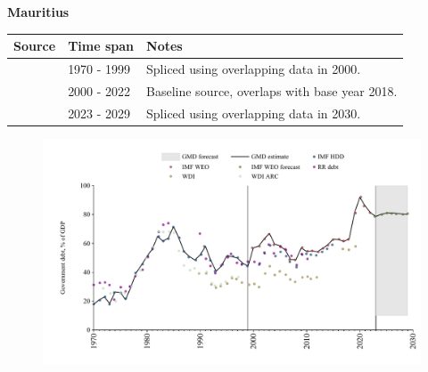 \documentclass[12pt,a4paper,landscape]{article}
\begin{document}
\begin{adjustbox}{max totalsize={\paperwidth}{\paperheight},center}
\begin{minipage}[t][\textheight][t]{\textwidth}
\vspace*{0.5cm}
{}
\begin{center}
{\Large\bfseries Mauritius}
\end{center}
\vspace{0.5cm}
\begin{table}[H]
\centering
\small
\begin{tabular}{|l|l|l|}
\hline
\textbf{Source} & \textbf{Time span} & \textbf{Notes} \\
\hline
\rowcolor{white}\cite{IMF_HDD}& 1970 - 1999 &Spliced using overlapping data in 2000.\\
\rowcolor{lightgray}\cite{IMF_WEO}& 2000 - 2022 &Baseline source, overlaps with base year 2018.\\
\rowcolor{white}\cite{IMF_WEO_forecast}& 2023 - 2029 &Spliced using overlapping data in 2030.\\
\hline
\end{tabular}
\end{table}
\begin{figure}[H]
\centering
\includegraphics[width=\textwidth,height=0.6\textheight,keepaspectratio]{graphs/MUS_govdebt_GDP.pdf}
\end{figure}
\end{minipage}
\end{adjustbox}
\end{document}
